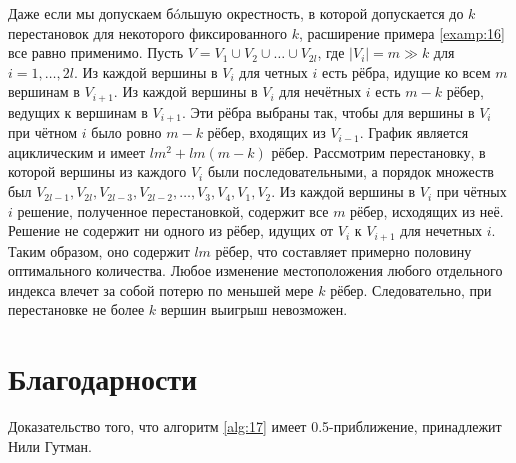 \documentclass[a4paper, 12pt, oneside]{extarticle}  %
\begin{document}
Даже если мы допускаем бóльшую окрестность, в которой допускается до $k$ перестановок для некоторого фиксированного $k$, расширение примера \ref{examp:16} все равно применимо. Пусть $V = V_1 \cup V_2 \cup \ldots \cup V_{2l}$, где $|V_i| = m \gg k$ для $i=1,\ldots,2l$. Из каждой вершины в $V_i$ для
четных $i$ есть рёбра, идущие ко всем $m$ вершинам в $V_{i+1}$. Из каждой вершины в $V_i$ для нечётных
$i$ есть $m-k$ рёбер, ведущих к вершинам в $V_{i+1}$. Эти рёбра выбраны так, чтобы для вершины в $V_i$ при чётном $i$ было ровно $m-k$ рёбер, входящих из $V_{i-1}$. График является ациклическим и имеет $lm^2 + lm(m-k)$ рёбер. Рассмотрим перестановку, в которой вершины из каждого $V_i$ были последовательными, а порядок множеств был $V_{2l-1}, V_{2l}, V_{2l-3}, V_{2l-2}, \ldots, V_3, V_4, V_1, V_2$. Из каждой вершины в $V_i$ при чётных $i$ решение, полученное перестановкой, содержит все $m$ рёбер, исходящих из неё. Решение не содержит ни одного из рёбер, идущих от $V_i$ к $V_{i+1}$ для нечетных $i$. Таким образом, оно содержит $lm$ рёбер, что составляет примерно половину оптимального количества. Любое изменение местоположения любого отдельного индекса влечет за собой потерю по меньшей мере $k$ рёбер. Следовательно, при перестановке не более $k$ вершин выигрыш невозможен.


\section{Благодарности}

Доказательство того, что алгоритм \ref{alg:17} имеет 0.5-приближение, принадлежит Нили Гутман.





\end{document}
